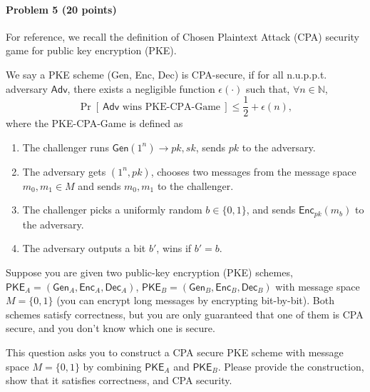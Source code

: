 \paragraph{Problem 5 (20 points)} 
For reference, we recall the definition of Chosen Plaintext Attack (CPA) security game for public key encryption (PKE).

\begin{definition}
We say a PKE scheme (Gen, Enc, Dec) is CPA-secure, if for all n.u.p.p.t. adversary $\mathsf{Adv}$, there exists a negligible function $\epsilon(\cdot)$ such that, $\forall n \in \mathbb{N}$,
\begin{equation*}
    \Pr[ ~\mathsf{Adv}\text{ wins PKE-CPA-Game} ~]\leq \frac{1}{2} + \epsilon(n),
\end{equation*}
where the PKE-CPA-Game is defined as
\begin{enumerate}
\item The challenger runs $\mathsf{Gen}(1^n)\rightarrow pk, sk$, sends $pk$ to the adversary. 
\item The adversary gets $(1^n, pk)$, chooses two messages from the message space $m_0, m_1\in M$ and sends $m_0, m_1$ to the challenger. 
\item The challenger picks a uniformly random $b\in\{0, 1\}$, and sends $\mathsf{Enc}_{pk}(m_b)$ to the adversary.
\item The adversary outputs a bit $b'$, wins if $b' = b$.
\end{enumerate}
\end{definition}

Suppose you are given two public-key encryption (PKE) schemes, $\mathsf{PKE}_A = (\mathsf{Gen}_A, \mathsf{Enc}_A, \mathsf{Dec}_A)$, $\mathsf{PKE}_B = (\mathsf{Gen}_B, \mathsf{Enc}_B, \mathsf{Dec}_B)$ with message space $M = \{ 0, 1 \}$ (you can encrypt long messages by encrypting bit-by-bit). Both schemes satisfy correctness, but you are only guaranteed that one of them is CPA secure, and you don't know which one is secure. 

This question asks you to construct a CPA secure PKE scheme with message space $M = \{ 0, 1 \}$ by combining $\mathsf{PKE}_A$ and $\mathsf{PKE}_B$. Please provide the construction, show that it satisfies correctness, and CPA security. 
